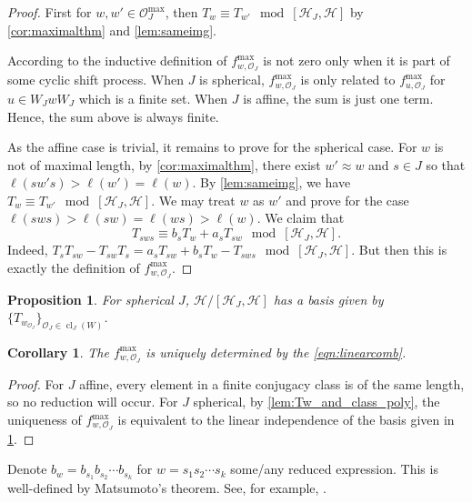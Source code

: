\documentclass[a4paper, reqno, 14pt]{amsart}
\def\co{\mathcal{O}}
\def\ch{\mathcal{H}}
\DeclareMathOperator{\cl}{cl}
\newtheorem{prop}[thm]{Proposition}
\newtheorem{cor}[thm]{Corollary}
\theoremstyle{definition}
\theoremstyle{remark}
\numberwithin{equation}{section}
\numberwithin{thm}{section}
\begin{document}
        \begin{proof}
            
            First for $w, w' \in \co^{\max}_{J}$, then $T_w\equiv T_{w'} \mod [\ch_J,\ch]$ by \cref{cor:maximalthm} and \cref{lem:sameimg}.

            According to the inductive definition of $f^{\max}_{w,\co_J}$ is not zero only when it is part of some cyclic shift process. When $J$ is spherical, $f^{\max}_{w,\co_J}$ is only related to $f^{\max}_{u,\co_J}$ for $u\in W_JwW_J$ which is a finite set. When $J$ is affine, the sum is just one term. Hence, the sum above is always finite.
            
            As the affine case is trivial, it remains to prove for the spherical case. For $w$ is not of maximal length, by \cref{cor:maximalthm}, there exist $w'\approx w$ and $s\in J$ so that $\ell(sw's)> \ell(w')=\ell(w)$. By \cref{lem:sameimg}, we have $T_w\equiv T_{w'}\mod [\ch_J,\ch]$. We may treat $w$ as $w'$ and prove for the case $\ell(sws)>\ell(sw)=\ell(ws)>\ell(w)$. We claim that $$T_{sws}\equiv b_sT_{w}+ a_sT_{sw} \mod [\ch_J,\ch].$$ Indeed, $ T_sT_{sw}-T_{sw}T_s=a_sT_{sw}+b_sT_w-T_{sws} \mod [\ch_J,\ch]$. But then this is exactly the definition of $f^{\max}_{w,\co_J}$.
        \end{proof}

      
        
        \begin{prop}\cite{partialcocenterADLV}\label{prop:cocenterbasis} 
        For spherical $J$, $\mathcal{H}/[\mathcal{H}_J,\mathcal{H}]$ has a basis given by $\{T_{w_{\co_J}}\}_{\co_J\in\cl_J(W)}$.
        \end{prop}

        
        \begin{cor}
            The $f^{\max}_{w,\co_J}$ is uniquely determined by the \cref{eqn:linearcomb}.
        \end{cor}

        \begin{proof}
            For $J$ affine, every element in a finite conjugacy class is of the same length, so no reduction will occur. For $J$ spherical, by \cref{lem:Tw_and_class_poly}, the uniqueness of $f^{\max}_{w,\co_J}$ is equivalent to the linear independence of the basis given in \cref{prop:cocenterbasis}. 
        \end{proof}

        Denote $b_w=b_{s_1}b_{s_2}\cdots b_{s_k}$ for $w=s_1s_2\cdots s_k$ some/any reduced expression. This is well-defined by Matsumoto's theorem. See, for example, \cite[\S 1.2]{geck2000characters}.
        
\end{document}
